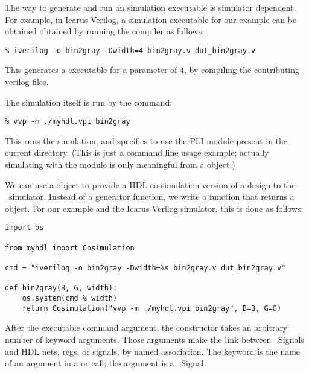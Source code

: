 The way to generate and run an simulation executable is simulator
dependent.  For example, in Icarus Verilog, a simulation executable
for our example can be obtained obtained by running the
 compiler as follows:

\begin{verbatim}
% iverilog -o bin2gray -Dwidth=4 bin2gray.v dut_bin2gray.v

\end{verbatim}

This generates a  executable for a parameter 
of 4, by compiling the contributing verilog files.

The simulation itself is run by the  command:

\begin{verbatim}
% vvp -m ./myhdl.vpi bin2gray

\end{verbatim}

This runs the  simulation, and specifies to use the
 PLI module present in the current directory. (This is 
just a command line usage example; actually simulating with the
 module is only meaningful from a
 object.)

We can use a  object to provide a HDL co-simulation
version of a design to the \myhdl\ simulator. Instead of a generator
function, we write a function that returns a 
object. For our example and the Icarus Verilog simulator, this is done
as follows:

\begin{verbatim}
import os

from myhdl import Cosimulation

cmd = "iverilog -o bin2gray -Dwidth=%s bin2gray.v dut_bin2gray.v"
      
def bin2gray(B, G, width):
    os.system(cmd % width)
    return Cosimulation("vvp -m ./myhdl.vpi bin2gray", B=B, G=G)

\end{verbatim}

After the executable command argument, the 
constructor takes an arbitrary number of keyword arguments. Those
arguments make the link between \myhdl\ Signals and HDL nets, regs, or
signals, by named association. The keyword is the name of an argument
in a  or  call; the argument is
a \myhdl\ Signal.

